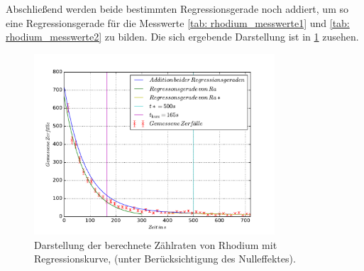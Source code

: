 Abschließend werden beide bestimmten Regressionsgerade noch addiert, um so eine
Regressionsgerade für die Messwerte \ref{tab: rhodium_messwerte1} und \ref{tab: rhodium_messwerte2} zu bilden.
Die sich ergebende Darstellung ist in \ref{fig: plot_rhodium_addi} zusehen.

\begin{figure}
  \centering
  \includegraphics[width=0.8\textwidth]{pics/ra_addi.pdf}
  \caption{Darstellung der berechnete Zählraten von Rhodium mit Regressionskurve, (unter Berücksichtigung des Nulleffektes).}
  \label{fig: plot_rhodium_addi}
\end{figure}
